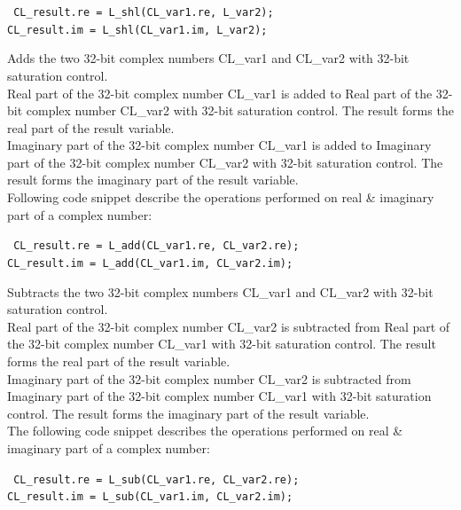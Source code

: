 {\tt {} CL\_result.re = L\_shl(CL\_var1.re, L\_var2);\\
 CL\_result.im = L\_shl(CL\_var1.im, L\_var2);
}


Adds the two 32-bit complex numbers CL\_var1 and CL\_var2 with 32-bit saturation control.\\
Real part of the 32-bit complex number CL\_var1 is added to Real part of the 32-bit complex number CL\_var2 with 32-bit saturation control.
The result forms the real part of the result variable.\\
Imaginary part of the 32-bit complex number CL\_var1 is added to Imaginary part of the 32-bit complex number CL\_var2 with 32-bit saturation control.
The result forms the imaginary part of the result variable.\\
Following code snippet describe the operations performed on real \& imaginary part of a complex number:

{\tt {} CL\_result.re = L\_add(CL\_var1.re, CL\_var2.re);\\
 CL\_result.im = L\_add(CL\_var1.im, CL\_var2.im);
}


Subtracts the two 32-bit complex numbers CL\_var1 and CL\_var2 with 32-bit saturation control.\\
Real part of the 32-bit complex number CL\_var2 is subtracted from Real part of the 32-bit complex number CL\_var1 with 32-bit saturation control.
The result forms the real part of the result variable.\\
Imaginary part of the 32-bit complex number CL\_var2 is subtracted from Imaginary part of the 32-bit complex number CL\_var1 with 32-bit saturation control.
The result forms the imaginary part of the result variable.\\
The following code snippet describes the operations performed on real \& imaginary part of a complex number:

{\tt {} CL\_result.re = L\_sub(CL\_var1.re, CL\_var2.re);\\
 CL\_result.im = L\_sub(CL\_var1.im, CL\_var2.im);
}


